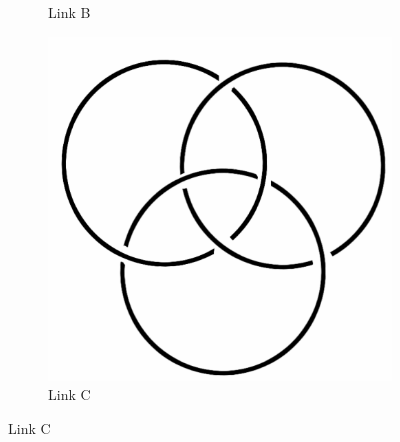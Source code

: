 \documentclass[12pt,letterpaper]{article}
\theoremstyle{definition}
\begin{document}
\begin{figure}[h]
\begin{subfigure}{.3\textwidth}
        \caption{Link B}
    \end{subfigure}
    \quad
    \begin{subfigure}{.3\textwidth}
        \centering
        \includegraphics[width=\textwidth]{knotpics/borromean.png}
        \caption{Link C}
    \end{subfigure}
    

\end{figure}
\end{document}
